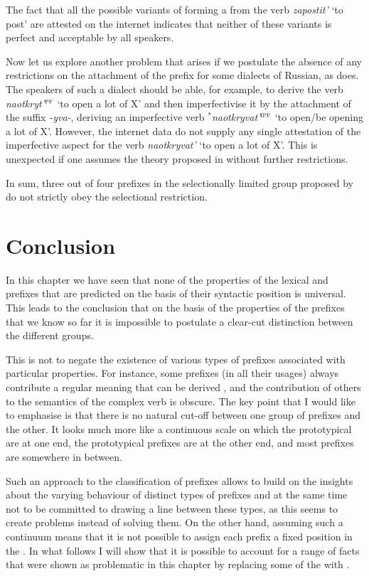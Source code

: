 The fact that all the possible variants of forming a  from the verb \textit{zapostit'} `to post' are attested on the internet indicates that neither of these variants is perfect and acceptable by all speakers.

Now let us explore another problem that arises if we postulate the absence of any restrictions on the attachment of the prefix  for some dialects of Russian, as \citet{Tatevosov:13a} does. The speakers of such a dialect should be able, for example, to derive the verb \textit{naotkryt'}$^{\textsc{pf}}$ `to open a lot of X' and then imperfectivise it by the attachment of the suffix \textit{-yva-}, deriving an imperfective verb $^*$\textit{naotkryvat'}$^{\textsc{ipf}}$ `to open/be opening a lot of X'. However, the internet data do not supply any single attestation of the imperfective aspect for the verb \textit{naotkryvat'} `to open a lot of X'. This is unexpected if one assumes the theory proposed in \citet{Tatevosov:13a} without further restrictions.\largerpage

In sum, three out of four prefixes in the selectionally limited group proposed by \citet{Tatevosov:09} do not strictly obey the selectional restriction. 

\section{Conclusion}\label{section:new:conclusion}
In this chapter we have seen that none of the properties of the lexical and  prefixes that are predicted on the basis of their syntactic position is universal. This leads to the conclusion that on the basis of the properties of the prefixes that we know so far it is impossible to postulate a clear-cut distinction between the different groups. 

This is not to negate the existence of various types of prefixes associated with particular properties. For instance, some prefixes (in all their usages) always contribute a regular meaning that can be derived , and the contribution of others to the semantics of the complex verb is obscure. The key point that I would like to emphasise is that there is no natural cut-off between one group of prefixes and the other. It looks much more like a continuous scale on which the prototypical  are at one end, the prototypical  prefixes are at the other end, and most prefixes are somewhere in between. 

Such an approach to the classification of prefixes allows to build on the insights about the varying behaviour of distinct types of prefixes and at the same time not to be committed to drawing a line between these types, as this seems to create problems instead of solving them. On the other hand, assuming such a continuum means that it is not possible to assign each prefix a fixed position in the . In what follows I will show that it is possible to account for a range of facts that were shown as problematic in this chapter by replacing some of the  with .
